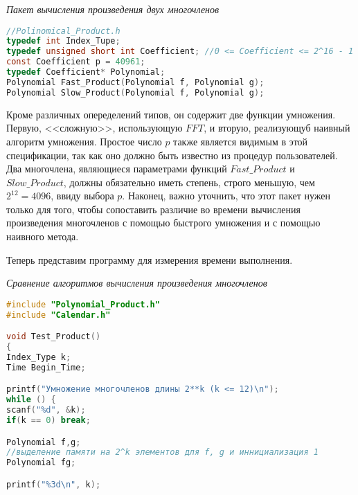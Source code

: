 \documentclass{mai_book}
\begin{document}
	\newpage

	\textit{Пакет вычисления произведения двух многочленов}
	
	\begin{lstlisting}[language=C,
basicstyle=\scriptsize,
linewidth=7cm,
belowskip=-1em,
mathescape=true]
//Polinomical_Product.h
typedef int Index_Tupe;
typedef unsigned short int Coefficient; //0 <= Coefficient <= 2^16 - 1
const Coefficient p = 40961;
typedef Coefficient* Polynomial;
Polynomial Fast_Product(Polynomial f, Polynomial g);
Polynomial Slow_Product(Polynomial f, Polynomial g);	
	\end{lstlisting}

\bigskip	

	Кроме различных опеределений типов, он содержит две функции умножения. Первую, <<сложную>>, использующую $FFT$, и вторую, реализующуб наивный алгоритм умножения. Простое число $p$ также является видимым в этой спецификации, так как оно должно быть известно из процедур пользователей. Два многочлена, являющиеся параметрами функций $Fast \_ Product$ и $Slow \_ Product$,  должны обязательно иметь степень, строго меньшую, чем $2^{12} = 4096$, ввиду выбора $p$. Наконец, важно уточнить, что этот пакет нужен только для того, чтобы сопоставить различие во времени вычисления произведения многочленов с помощью быстрого умножения и с помощью наивного метода.
	
	Теперь представим программу для измерения времени выполнения.
	
	\textit{Сравнение алгоритмов вычисления произведения многочленов}
	
\begin{lstlisting}[language=C,
basicstyle=\scriptsize,
linewidth=7cm,
belowskip=-1em,
mathescape=true]
#include "Polynomial_Product.h"
#include "Calendar.h"

void Test_Product()
{
Index_Type k;
Time Begin_Time;

printf("Умножение многочленов длины 2**k (k <= 12)\n");
while () {
scanf("%d", &k);
if(k == 0) break;

Polynomial f,g;
//выделение памяти на 2^k элементов для f, g и иннициализация 1
Polynomial fg;

printf("%3d\n", k);

\end{lstlisting}	
	
	\newpage
	
	
\end{document}
